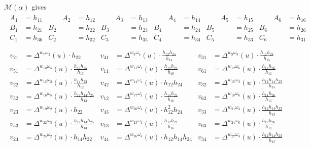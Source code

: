\documentclass{amsart}
\theoremstyle{plain}
\theoremstyle{definition}
\theoremstyle{remark}
\newcommand{\conftoquiv}{\mathcal{M}}
\newcommand{\fundamentalweight}{\omega}
\newcommand{\genminor}[2]{\Delta^{{#1} \fundamentalweight_{#2}}}
\begin{document}
  $\conftoquiv(\alpha)$ gives
  \begin{equation*}
    \begin{gathered}
      \begin{aligned}
        A_1 &= h_{11} &\qquad A_2 &= h_{12} &\qquad A_3 &= h_{13} &\qquad A_4 &= h_{14} &\qquad A_5 &= h_{15} &\qquad A_6 &= h_{16} \\
        B_1 &= h_{21} & B_2 &= h_{22} & B_3 &= h_{23} & B_4 &= h_{24} & B_5 &= h_{25} & B_6 &= h_{26} \\
        C_1 &= h_{36} & C_2 &= h_{32} & C_3 &= h_{35} & C_4 &= h_{34} & C_5 &= h_{33} & C_6 &= h_{31} \\
      \end{aligned}
      \\
      \begin{aligned}
        v_{2 1} &= \genminor{w_{7}}{2}(u) \cdot h_{22} & v_{4 1} &= \genminor{w_{8}}{4}(u) \cdot \frac{h_{12} h_{24} }{h_{14}} & v_{3 1} &= \genminor{w_{9}}{3}(u) \cdot \frac{h_{12} h_{23} }{h_{15}} \\
        v_{5 1} &= \genminor{w_{10}}{5}(u) \cdot \frac{h_{12} h_{25} }{h_{13}} & v_{1 1} &= \genminor{w_{11}}{1}(u) \cdot \frac{h_{12} h_{21} }{h_{16}} & v_{6 1} &= \genminor{w_{12}}{6}(u) \cdot \frac{h_{12} h_{26} }{h_{11}} \\
        v_{2 2} &= \genminor{w_{13}}{2}(u) \cdot \frac{h_{14} h_{22} }{h_{12}} & v_{4 2} &= \genminor{w_{14}}{4}(u) \cdot h_{12} h_{24} & v_{3 2} &= \genminor{w_{15}}{3}(u) \cdot \frac{h_{12} h_{14} h_{23} }{h_{15}} \\
        v_{5 2} &= \genminor{w_{16}}{5}(u) \cdot \frac{h_{12} h_{14} h_{25} }{h_{13}} & v_{1 2} &= \genminor{w_{17}}{1}(u) \cdot \frac{h_{14} h_{21} }{h_{16}} & v_{6 2} &= \genminor{w_{18}}{6}(u) \cdot \frac{h_{14} h_{26} }{h_{11}} \\
        v_{2 3} &= \genminor{w_{19}}{2}(u) \cdot h_{22} & v_{4 3} &= \genminor{w_{20}}{4}(u) \cdot h_{12}^2 h_{24} & v_{3 3} &= \genminor{w_{21}}{3}(u) \cdot \frac{h_{12} h_{14} h_{23} }{h_{15}} \\
        v_{5 3} &= \genminor{w_{22}}{5}(u) \cdot \frac{h_{12} h_{14} h_{25} }{h_{13}} & v_{1 3} &= \genminor{w_{23}}{1}(u) \cdot \frac{h_{12} h_{21} }{h_{16}} & v_{6 3} &= \genminor{w_{24}}{6}(u) \cdot \frac{h_{12} h_{26} }{h_{11}} \\
        v_{2 4} &= \genminor{w_{25}}{2}(u) \cdot h_{14} h_{22} & v_{4 4} &= \genminor{w_{26}}{4}(u) \cdot h_{12} h_{14} h_{24} & v_{3 4} &= \genminor{w_{27}}{3}(u) \cdot \frac{h_{12} h_{14} h_{23} }{h_{15}} \\

\end{aligned}
\end{gathered}
\end{equation*}
\end{document}

